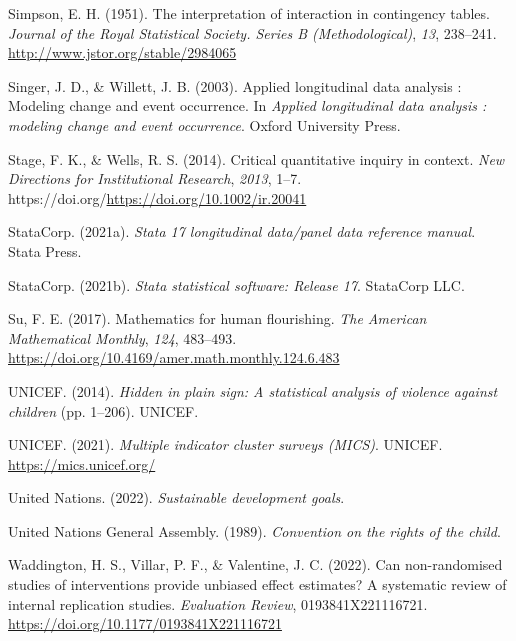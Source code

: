\documentclass[
  letterpaper,
  DIV=11,
  numbers=noendperiod]{scrreprt}
\newlength{\cslhangindent}
\newlength{\cslentryspacingunit} %
\newenvironment{CSLReferences}[2] %
 {%
  \setlength{\parindent}{0pt}
  \ifodd #1
  \let\oldpar\par
  \def\par{\hangindent=\cslhangindent\oldpar}
  \fi
  \setlength{\parskip}{#2\cslentryspacingunit}
 }%
 {}
\begin{document}
\begin{CSLReferences}{1}{0}
\leavevmode{}%
Simpson, E. H. (1951). The interpretation of interaction in contingency
tables. \emph{Journal of the Royal Statistical Society. Series B
(Methodological)}, \emph{13}, 238--241.
\url{http://www.jstor.org/stable/2984065}

\leavevmode{}%
Singer, J. D., \& Willett, J. B. (2003). Applied longitudinal data
analysis : Modeling change and event occurrence. In \emph{Applied
longitudinal data analysis : modeling change and event occurrence}.
Oxford University Press.

\leavevmode{}%
Stage, F. K., \& Wells, R. S. (2014). Critical quantitative inquiry in
context. \emph{New Directions for Institutional Research}, \emph{2013},
1--7. https://doi.org/\url{https://doi.org/10.1002/ir.20041}

\leavevmode{}%
StataCorp. (2021a). \emph{Stata 17 longitudinal data/panel data
reference manual}. Stata Press.

\leavevmode{}%
StataCorp. (2021b). \emph{Stata statistical software: Release 17}.
StataCorp LLC.

\leavevmode{}%
Su, F. E. (2017). Mathematics for human flourishing. \emph{The American
Mathematical Monthly}, \emph{124}, 483--493.
\url{https://doi.org/10.4169/amer.math.monthly.124.6.483}

\leavevmode{}%
UNICEF. (2014). \emph{Hidden in plain sign: A statistical analysis of
violence against children} (pp. 1--206). UNICEF.

\leavevmode{}%
UNICEF. (2021). \emph{Multiple indicator cluster surveys (MICS)}.
UNICEF. \url{https://mics.unicef.org/}

\leavevmode{}%
United Nations. (2022). \emph{Sustainable development goals}.

\leavevmode{}%
United Nations General Assembly. (1989). \emph{Convention on the rights
of the child}.

\leavevmode{}%
Waddington, H. S., Villar, P. F., \& Valentine, J. C. (2022). Can
non-randomised studies of interventions provide unbiased effect
estimates? A systematic review of internal replication studies.
\emph{Evaluation Review}, 0193841X221116721.
\url{https://doi.org/10.1177/0193841X221116721}


\end{CSLReferences}
\end{document}
